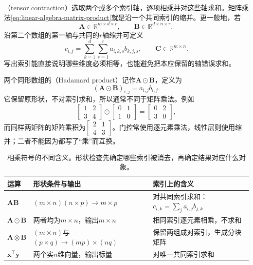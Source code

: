 （tensor contraction）选取两个或多个索引轴，逐项相乘并对这些轴求和。矩阵乘法\eqref{eq:linear-algebra-matrix-product}就是沿一个共同索引的缩并。更一般地，若
\[
  \bm{A}\in\mathbb{R}^{m\times d\times r},
  \qquad
  \bm{B}\in\mathbb{R}^{d\times n\times r},
\]
沿第二个数组的第一轴与共同的$r$轴缩并可定义
\[
  c_{i,j}
  =
  \sum_{k=1}^{d}\sum_{s=1}^{r}
  a_{i,k,s}b_{k,j,s},
  \qquad
  \bm{C}\in\mathbb{R}^{m\times n}.
\]
写出索引能直接说明哪些维度必须相等，也能避免把本应保留的轴错误求和。

两个同形数组的（Hadamard product）记作$\bm{A}\odot\bm{B}$，定义为
\[
  (\bm{A}\odot\bm{B})_{i,j}=a_{i,j}b_{i,j}.
\]
它保留原形状，不对索引求和，所以通常不同于矩阵乘法。例如
\[
  \begin{bmatrix} 1&2\\3&4 \end{bmatrix}
  \odot
  \begin{bmatrix} 0&1\\1&0 \end{bmatrix}
  =
  \begin{bmatrix} 0&2\\3&0 \end{bmatrix},
\]
而同样两矩阵的矩阵乘积为$\left[\begin{smallmatrix}2&1\\4&3\end{smallmatrix}\right]$。门控常使用逐元素乘法，线性层则使用缩并；二者不能因为都写了“乘”而互换。

\begin{table}[htbp]
 \centering\small
 \begin{tabularx}{\linewidth}{@{}lXX@{}}
 \toprule
 运算 & 形状条件与输出 & 索引上的含义\\
 \midrule
 $\bm A\bm B$ & $(m\times n)(n\times p)\to m\times p$ & 对共同索引求和：$c_{i,k}=\sum_j a_{i,j}b_{j,k}$\\
 $\bm A\odot\bm B$ & 两者均为$m\times n$，输出$m\times n$ & 相同索引逐元素相乘，不求和\\
 $\bm A\otimes\bm B$ & $(m\times n)$与$(p\times q)\to(mp)\times(nq)$ & 保留两组成对索引，生成分块矩阵\\
 $\bm x^{\top}\bm y$ & 两个实$n$维向量，输出标量 & 对唯一共同索引求和\\
 \bottomrule
 \end{tabularx}
 \caption{相乘符号的不同含义。形状检查先确定哪些索引被消去，再确定结果对应什么对象。}
 \label{tab:linear-algebra-products-and-shapes}
\end{table}

